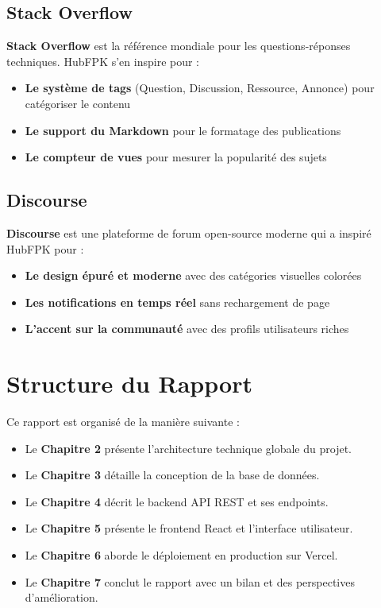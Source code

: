 \documentclass[12pt, a4paper]{report}
\begin{document}
\subsection{Stack Overflow}

\textbf{Stack Overflow} est la référence mondiale pour les questions-réponses techniques. HubFPK s'en inspire pour :

\begin{itemize}
    \item \textbf{Le système de tags} (Question, Discussion, Ressource, Annonce) pour catégoriser le contenu
    \item \textbf{Le support du Markdown} pour le formatage des publications
    \item \textbf{Le compteur de vues} pour mesurer la popularité des sujets
\end{itemize}

\subsection{Discourse}

\textbf{Discourse} est une plateforme de forum open-source moderne qui a inspiré HubFPK pour :

\begin{itemize}
    \item \textbf{Le design épuré et moderne} avec des catégories visuelles colorées
    \item \textbf{Les notifications en temps réel} sans rechargement de page
    \item \textbf{L'accent sur la communauté} avec des profils utilisateurs riches
\end{itemize}

\section{Structure du Rapport}

Ce rapport est organisé de la manière suivante :
\begin{itemize}
    \item Le \textbf{Chapitre 2} présente l'architecture technique globale du projet.
    \item Le \textbf{Chapitre 3} détaille la conception de la base de données.
    \item Le \textbf{Chapitre 4} décrit le backend API REST et ses endpoints.
    \item Le \textbf{Chapitre 5} présente le frontend React et l'interface utilisateur.
    \item Le \textbf{Chapitre 6} aborde le déploiement en production sur Vercel.
    \item Le \textbf{Chapitre 7} conclut le rapport avec un bilan et des perspectives d'amélioration.
\end{itemize}
\end{document}
